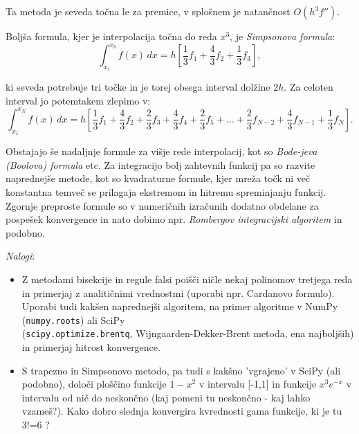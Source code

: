 \documentclass[12pt]{article}
\begin{document}
Ta metoda je seveda točna le za premice, v splošnem je natan\v
cnost $O(h^3 f'')$.

Boljša formula, kjer je interpolacija točna do reda $x^3$, je
\emph{Simpsonova formula}:
$$ \int_{x_1}^{x_3} f(x)\, dx = h \left [ \frac{1}{3} f_1 +
  \frac{4}{3} f_2 +  \frac{1}{3} f_3 \right ], $$

ki seveda potrebuje tri točke in je torej obsega interval dol\v
zine $2h$. Za celoten interval jo potemtakem zlepimo v:
$$ \int_{x_1}^{x_N} f(x)\, dx = h \left [ \frac{1}{3} f_1 +
  \frac{4}{3} f_2 +  \frac{2}{3} f_3 +
  \frac{4}{3} f_4 +  \frac{2}{3} f_5 + \ldots + \frac{2}{3} f_{N-2} +
  \frac{4}{3} f_{N-1} +  \frac{1}{3} f_N  \right ]. $$

Obstajajo še nadaljnje formule za višje rede interpolacij, kot
so \emph{Bode-jeva (Boolova) formula} etc. Za integracijo bolj zahtevnih funkcij
pa so razvite naprednejše metode, kot so kvadraturne formule, kjer
mreža točk ni več konstantna temveč se prilagaja ekstremom
in hitremu spreminjanju funkcij.  Zgornje preproste formule so v
numeričnih izračunih dodatno obdelane za pospešek konvergence
in nato dobimo npr. \emph{Rombergov integracijski algoritem} in
podobno.

\vskip 1cm

\emph{Nalogi}:
\begin{itemize}
\item Z metodami bisekcije in regule falsi poišči ničle nekaj polinomov
  tretjega reda in primerjaj z analitičnimi vrednostmi (uporabi npr. Cardanovo formulo).
  Uporabi tudi kakšen naprednejši algoritem, na primer algoritme v NumPy (\texttt{numpy.roots}) ali
  SciPy \\(\texttt{scipy.optimize.brentq}, Wijngaarden-Dekker-Brent metoda, ena najboljših) in primerjaj hitrost konvergence.
\item S trapezno in Simpsonovo metodo, pa tudi s kakšno 'vgrajeno' v SciPy (ali podobno), določi ploščino
  funkcije $1-x^2$ v intervalu [-1,1] in funkcije $x^3 e^{-x}$ v
  intervalu od nič do neskončno (kaj pomeni tu neskončno - kaj lahko vzameš?).
  Kako dobro slednja konvergira kvrednosti gama funkcije, ki je tu 3!=6 ?
\end{itemize}


\clearpage
\end{document}

